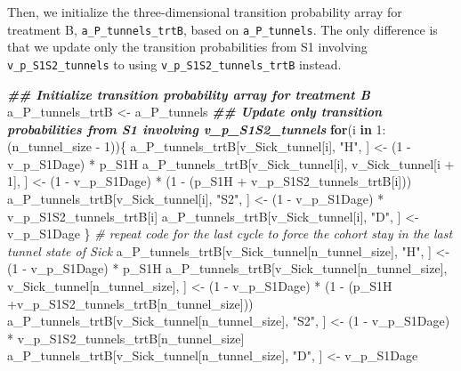 \documentclass[
]{article}
\newenvironment{Shaded}{\begin{snugshade}}{\end{snugshade}}
\newcommand{\CommentTok}[1]{\textcolor[rgb]{0.56,0.35,0.01}{\textit{#1}}}
\newcommand{\ControlFlowTok}[1]{\textcolor[rgb]{0.13,0.29,0.53}{\textbf{#1}}}
\newcommand{\DecValTok}[1]{\textcolor[rgb]{0.00,0.00,0.81}{#1}}
\newcommand{\DocumentationTok}[1]{\textcolor[rgb]{0.56,0.35,0.01}{\textbf{\textit{#1}}}}
\newcommand{\NormalTok}[1]{#1}
\newcommand{\OtherTok}[1]{\textcolor[rgb]{0.56,0.35,0.01}{#1}}
\newcommand{\SpecialCharTok}[1]{\textcolor[rgb]{0.00,0.00,0.00}{#1}}
\newcommand{\StringTok}[1]{\textcolor[rgb]{0.31,0.60,0.02}{#1}}
\begin{document}
Then, we initialize the three-dimensional transition probability array for treatment B, \texttt{a\_P\_tunnels\_trtB}, based on \texttt{a\_P\_tunnels}. The only difference is that we update only the transition probabilities from S1 involving \texttt{v\_p\_S1S2\_tunnels} to using \texttt{v\_p\_S1S2\_tunnels\_trtB} instead.

\begin{Shaded}
\begin{Highlighting}[]
\DocumentationTok{\#\# Initialize transition probability array for treatment B}
\NormalTok{a\_P\_tunnels\_trtB }\OtherTok{\textless{}{-}}\NormalTok{ a\_P\_tunnels}
\DocumentationTok{\#\# Update only transition probabilities from S1 involving v\_p\_S1S2\_tunnels}
\ControlFlowTok{for}\NormalTok{(i }\ControlFlowTok{in} \DecValTok{1}\SpecialCharTok{:}\NormalTok{(n\_tunnel\_size }\SpecialCharTok{{-}} \DecValTok{1}\NormalTok{))\{}
\NormalTok{  a\_P\_tunnels\_trtB[v\_Sick\_tunnel[i], }\StringTok{"H"}\NormalTok{, ] }\OtherTok{\textless{}{-}}\NormalTok{ (}\DecValTok{1} \SpecialCharTok{{-}}\NormalTok{ v\_p\_S1Dage) }\SpecialCharTok{*}\NormalTok{ p\_S1H}
\NormalTok{  a\_P\_tunnels\_trtB[v\_Sick\_tunnel[i], }
\NormalTok{              v\_Sick\_tunnel[i }\SpecialCharTok{+} \DecValTok{1}\NormalTok{], ] }\OtherTok{\textless{}{-}}\NormalTok{ (}\DecValTok{1} \SpecialCharTok{{-}}\NormalTok{ v\_p\_S1Dage) }\SpecialCharTok{*} 
\NormalTok{                                         (}\DecValTok{1} \SpecialCharTok{{-}}\NormalTok{ (p\_S1H }\SpecialCharTok{+}\NormalTok{ v\_p\_S1S2\_tunnels\_trtB[i]))}
\NormalTok{  a\_P\_tunnels\_trtB[v\_Sick\_tunnel[i], }\StringTok{"S2"}\NormalTok{, ] }\OtherTok{\textless{}{-}}\NormalTok{ (}\DecValTok{1} \SpecialCharTok{{-}}\NormalTok{ v\_p\_S1Dage) }\SpecialCharTok{*}\NormalTok{ v\_p\_S1S2\_tunnels\_trtB[i]}
\NormalTok{  a\_P\_tunnels\_trtB[v\_Sick\_tunnel[i], }\StringTok{"D"}\NormalTok{, ]  }\OtherTok{\textless{}{-}}\NormalTok{ v\_p\_S1Dage}
\NormalTok{\}}
\CommentTok{\# repeat code for the last cycle to force the cohort stay in the last tunnel state of Sick}
\NormalTok{a\_P\_tunnels\_trtB[v\_Sick\_tunnel[n\_tunnel\_size], }\StringTok{"H"}\NormalTok{, ] }\OtherTok{\textless{}{-}}\NormalTok{ (}\DecValTok{1} \SpecialCharTok{{-}}\NormalTok{ v\_p\_S1Dage) }\SpecialCharTok{*}\NormalTok{ p\_S1H}
\NormalTok{a\_P\_tunnels\_trtB[v\_Sick\_tunnel[n\_tunnel\_size],}
\NormalTok{            v\_Sick\_tunnel[n\_tunnel\_size], ] }\OtherTok{\textless{}{-}}\NormalTok{ (}\DecValTok{1} \SpecialCharTok{{-}}\NormalTok{ v\_p\_S1Dage) }\SpecialCharTok{*} 
\NormalTok{                                               (}\DecValTok{1} \SpecialCharTok{{-}}\NormalTok{ (p\_S1H }\SpecialCharTok{+}\NormalTok{v\_p\_S1S2\_tunnels\_trtB[n\_tunnel\_size]))}
\NormalTok{a\_P\_tunnels\_trtB[v\_Sick\_tunnel[n\_tunnel\_size], }\StringTok{"S2"}\NormalTok{, ] }\OtherTok{\textless{}{-}}\NormalTok{ (}\DecValTok{1} \SpecialCharTok{{-}}\NormalTok{ v\_p\_S1Dage) }\SpecialCharTok{*}
\NormalTok{                                                           v\_p\_S1S2\_tunnels\_trtB[n\_tunnel\_size]}
\NormalTok{a\_P\_tunnels\_trtB[v\_Sick\_tunnel[n\_tunnel\_size], }\StringTok{"D"}\NormalTok{, ]  }\OtherTok{\textless{}{-}}\NormalTok{ v\_p\_S1Dage}
\end{Highlighting}
\end{Shaded}
\end{document}

